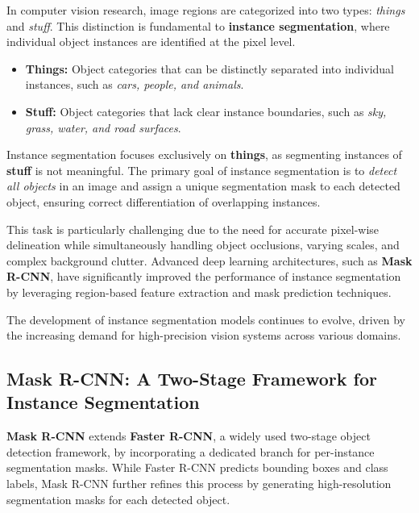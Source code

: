 \newpage

\noindent In computer vision research, image regions are categorized into two types: \emph{things} and \emph{stuff}. This distinction is fundamental to \textbf{instance segmentation}, where individual object instances are identified at the pixel level.

\begin{itemize}
	\item \textbf{Things:} Object categories that can be distinctly separated into individual instances, such as \emph{cars, people, and animals}.
	\item \textbf{Stuff:} Object categories that lack clear instance boundaries, such as \emph{sky, grass, water, and road surfaces}.
\end{itemize}

\noindent Instance segmentation focuses exclusively on \textbf{things}, as segmenting instances of \textbf{stuff} is not meaningful. The primary goal of instance segmentation is to \emph{detect all objects} in an image and assign a unique segmentation mask to each detected object, ensuring correct differentiation of overlapping instances.

\noindent This task is particularly challenging due to the need for accurate pixel-wise delineation while simultaneously handling object occlusions, varying scales, and complex background clutter. Advanced deep learning architectures, such as \textbf{Mask R-CNN}, have significantly improved the performance of instance segmentation by leveraging region-based feature extraction and mask prediction techniques. 

\noindent The development of instance segmentation models continues to evolve, driven by the increasing demand for high-precision vision systems across various domains.

\subsection{Mask R-CNN: A Two-Stage Framework for Instance Segmentation}
\label{subsec:chapter15_mask_rcnn}

\noindent \textbf{Mask R-CNN} extends \textbf{Faster R-CNN}, a widely used two-stage object detection framework, by incorporating a dedicated branch for per-instance segmentation masks. While Faster R-CNN predicts bounding boxes and class labels, Mask R-CNN further refines this process by generating high-resolution segmentation masks for each detected object.

